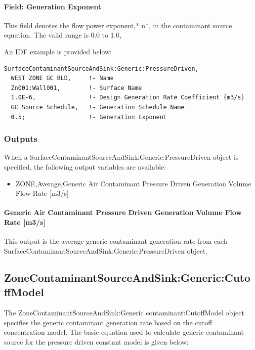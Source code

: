 \paragraph{Field: Generation Exponent}\label{field-generation-exponent}

This field denotes the flow power exponent,* n*, in the contaminant source equation. The valid range is 0.0 to 1.0,

An IDF example is provided below:

\begin{lstlisting}
SurfaceContaminantSourceAndSink:Generic:PressureDriven,
  WEST ZONE GC BLD,     !- Name
  Zn001:Wall001,        !- Surface Name
  1.0E-6,               !- Design Generation Rate Coefficient {m3/s}
  GC Source Schedule,   !- Generation Schedule Name
  0.5;                  !- Generation Exponent
\end{lstlisting}

\subsubsection{Outputs}\label{outputs-8-003}

When a Surface\-Contaminant\-Source\-And\-Sink:\-Generic:\-Pressure\-Driven object is specified, the following output variables are available:

\begin{itemize}
  \tightlist
  \item
    ZONE,Average,Generic Air Contaminant Pressure Driven Generation Volume Flow Rate {[}m3/s{]}
\end{itemize}

\paragraph{Generic Air Contaminant Pressure Driven Generation Volume Flow Rate {[}m3/s{]}}\label{generic-air-contaminant-pressure-driven-generation-volume-flow-rate-m3s}

This output is the average generic contaminant generation rate from each Surface\-Contaminant\-Source\-And\-Sink:\-Generic:\-Pressure\-Driven object.

\subsection{ZoneContaminantSourceAndSink:Generic:CutoffModel}\label{zonecontaminantsourceandsinkgenericcutoffmodel}

The Zone\-Contaminant\-Source\-And\-Sink:\-Generic contaminant:CutoffModel object specifies the generic contaminant generation rate based on the cutoff concentration model. The basic equation used to calculate generic contaminant source for the pressure driven constant model is given below:

